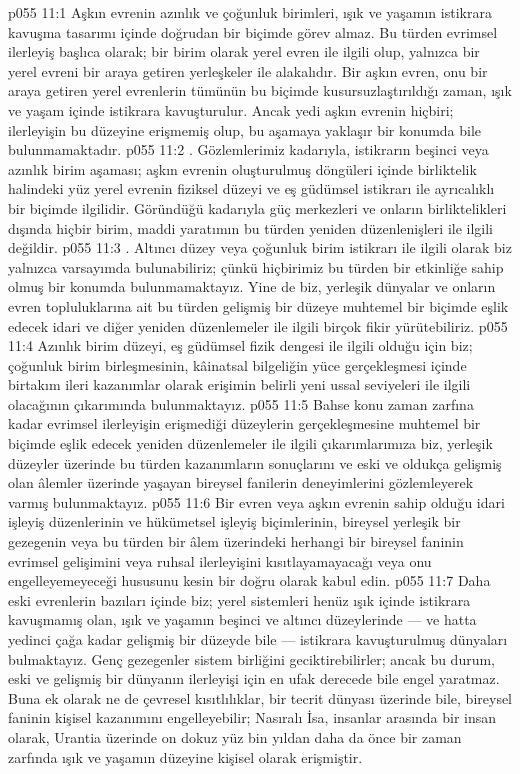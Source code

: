 \vs p055 11:1 Aşkın evrenin azınlık ve çoğunluk birimleri, ışık ve yaşamın istikrara kavuşma tasarımı içinde doğrudan bir biçimde görev almaz. Bu türden evrimsel ilerleyiş başlıca olarak; bir birim olarak yerel evren ile ilgili olup, yalnızca bir yerel evreni bir araya getiren yerleşkeler ile alakalıdır. Bir aşkın evren, onu bir araya getiren yerel evrenlerin tümünün bu biçimde kusursuzlaştırıldığı zaman, ışık ve yaşam içinde istikrara kavuşturulur. Ancak yedi aşkın evrenin hiçbiri; ilerleyişin bu düzeyine erişmemiş olup, bu aşamaya yaklaşır bir konumda bile bulunmamaktadır.
\vs p055 11:2 . Gözlemlerimiz kadarıyla, istikrarın beşinci veya azınlık birim aşaması; aşkın evrenin oluşturulmuş döngüleri içinde birliktelik halindeki yüz yerel evrenin fiziksel düzeyi ve eş güdümsel istikrarı ile ayrıcalıklı bir biçimde ilgilidir. Göründüğü kadarıyla güç merkezleri ve onların birliktelikleri dışında hiçbir birim, maddi yaratımın bu türden yeniden düzenlenişleri ile ilgili değildir.
\vs p055 11:3 . Altıncı düzey veya çoğunluk birim istikrarı ile ilgili olarak biz yalnızca varsayımda bulunabiliriz; çünkü hiçbirimiz bu türden bir etkinliğe sahip olmuş bir konumda bulunmamaktayız. Yine de biz, yerleşik dünyalar ve onların evren topluluklarına ait bu türden gelişmiş bir düzeye muhtemel bir biçimde eşlik edecek idari ve diğer yeniden düzenlemeler ile ilgili birçok fikir yürütebiliriz.
\vs p055 11:4 Azınlık birim düzeyi, eş güdümsel fizik dengesi ile ilgili olduğu için biz; çoğunluk birim birleşmesinin, kâinatsal bilgeliğin yüce gerçekleşmesi içinde birtakım ileri kazanımlar olarak erişimin belirli yeni ussal seviyeleri ile ilgili olacağının çıkarımında bulunmaktayız.
\vs p055 11:5 Bahse konu zaman zarfına kadar evrimsel ilerleyişin erişmediği düzeylerin gerçekleşmesine muhtemel bir biçimde eşlik edecek yeniden düzenlemeler ile ilgili çıkarımlarımıza biz, yerleşik düzeyler üzerinde bu türden kazanımların sonuçlarını ve eski ve oldukça gelişmiş olan âlemler üzerinde yaşayan bireysel fanilerin deneyimlerini gözlemleyerek varmış bulunmaktayız.
\vs p055 11:6 Bir evren veya aşkın evrenin sahip olduğu idari işleyiş düzenlerinin ve hükümetsel işleyiş biçimlerinin, bireysel yerleşik bir gezegenin veya bu türden bir âlem üzerindeki herhangi bir bireysel faninin evrimsel gelişimini veya ruhsal ilerleyişini kısıtlayamayacağı veya onu engelleyemeyeceği hususunu kesin bir doğru olarak kabul edin.
\vs p055 11:7 Daha eski evrenlerin bazıları içinde biz; yerel sistemleri henüz ışık içinde istikrara kavuşmamış olan, ışık ve yaşamın beşinci ve altıncı düzeylerinde --- ve hatta yedinci çağa kadar gelişmiş bir düzeyde bile --- istikrara kavuşturulmuş dünyaları bulmaktayız. Genç gezegenler sistem birliğini geciktirebilirler; ancak bu durum, eski ve gelişmiş bir dünyanın ilerleyişi için en ufak derecede bile engel yaratmaz. Buna ek olarak ne de çevresel kısıtlılıklar, bir tecrit dünyası üzerinde bile, bireysel faninin kişisel kazanımını engelleyebilir; Nasıralı İsa, insanlar arasında bir insan olarak, Urantia üzerinde on dokuz yüz bin yıldan daha da önce bir zaman zarfında ışık ve yaşamın düzeyine kişisel olarak erişmiştir.
